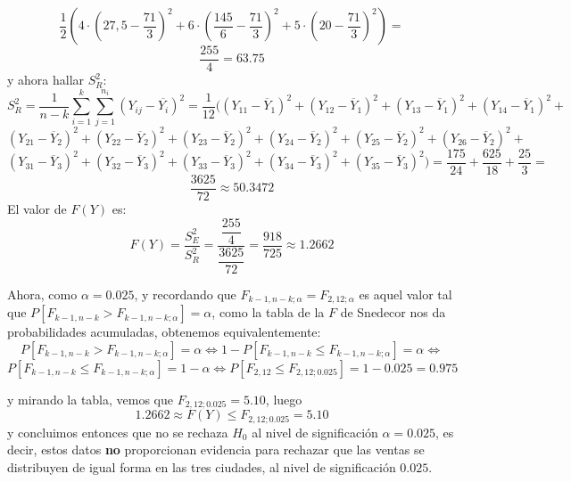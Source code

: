\documentclass[12pt]{article}
\begin{document}
\begin{ejercicio}
\begin{enumerate}[label=\alph*)]
$$                \dfrac{1}{2} \left(4 \cdot \left(27,5 - \dfrac{71}{3} \right)^2 + 
                6 \cdot \left(\dfrac{145}{6} - \dfrac{71}{3} \right)^2 + 
                5 \cdot \left( 20 - \dfrac{71}{3} \right)^2 \right) = $$
                $$\dfrac{255}{4} = 63.75$$
                y ahora hallar $S_R^2$:
                $$S_R^2 = \dfrac{1}{n-k} \sum_{i=1}^{k} \sum_{j=1}^{n_i} (Y_{ij} - \overline{Y_i})^2 = 
                \dfrac{1}{12} ((Y_{11} - \overline{Y}_1)^2 + (Y_{12} - \overline{Y}_1)^2
                + (Y_{13} - \overline{Y}_1)^2 + (Y_{14} - \overline{Y}_1)^2 + $$
                $$(Y_{21} - \overline{Y}_2)^2 + (Y_{22} - \overline{Y}_2)^2
                + (Y_{23} - \overline{Y}_2)^2 + (Y_{24} - \overline{Y}_2)^2 + 
                (Y_{25} - \overline{Y}_2)^2 + (Y_{26} - \overline{Y}_2)^2 +$$
                $$(Y_{31} - \overline{Y}_3)^2 + (Y_{32} - \overline{Y}_3)^2
                + (Y_{33} - \overline{Y}_3)^2 + (Y_{34} - \overline{Y}_3)^2 + 
                (Y_{35} - \overline{Y}_3)^2) = \dfrac{175}{24} + \dfrac{625}{18} + \dfrac{25}{3} = $$
                $$\dfrac{3625}{72} \approx 50.3472$$
                El valor de $F(Y)$ es:
                $$F(Y) = \dfrac{S_E^2}{S_R^2} = \dfrac{\dfrac{255}{4}}{\dfrac{3625}{72}} = 
                \dfrac{918}{725} \approx 1.2662$$

                Ahora, como $\alpha = 0.025$, y recordando que $F_{k-1, n-k; \alpha} = 
                F_{2, 12; \alpha}$ es aquel valor tal que $P[F_{k-1, n-k} > F_{k-1, n-k; \alpha}] = \alpha$,
                como la tabla de la $F$ de Snedecor nos da probabilidades acumuladas, obtenemos
                equivalentemente:
                $$P[F_{k-1, n-k} > F_{k-1, n-k; \alpha}] = \alpha \iff 
                1 - P[F_{k-1, n-k} \leq F_{k-1, n-k; \alpha}] = \alpha \iff$$
                $$P[F_{k-1, n-k} \leq F_{k-1, n-k; \alpha}] = 1 - \alpha \iff
                P[F_{2, 12} \leq F_{2, 12; 0.025}] = 1 - 0.025 = 0.975$$

                y mirando la tabla, vemos que $F_{2, 12; 0.025} = 5.10$, luego 
                $$1.2662 \approx F(Y) \leq F_{2, 12; 0.025} = 5.10$$
                y concluimos entonces que no se rechaza $H_0$ al nivel de significación $\alpha = 0.025$, 
                es decir, estos datos \textbf{no} proporcionan evidencia para rechazar que las ventas se 
                distribuyen de igual forma en las tres ciudades, al nivel de significación $0.025$.
        \end{enumerate}
    \end{ejercicio}
\end{document}
